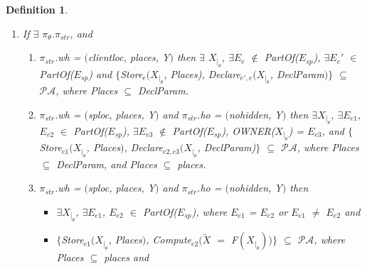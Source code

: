 \documentclass[a4paper]{article}
\newtheorem{ttd}{Definition}
\begin{document}
\begin{ttd}
\begin{enumerate}
\begin{itemize}
\item $\{$\textit{Use}$_{\textit{bywhom}}$$($$X_{|_{\theta}}$, \textit{UPurposes}), \textit{UConsent}$_{e1,e2}$$($$X_{|_{\theta}}$, \textit{UPurposes}, \textit{ByWhom}), \textit{Declare}$_{e1',e2}$$(X_{|_{\theta}}$, \textit{DeclParam}$)\}$ $\subseteq$ $\mathcal{P}\mathcal{A}$ such that  \textit{UPurposes} $\cup$ \textit{ByWhom} $\subseteq$ \textit{DeclParam}, and \textit{UPurposes} $\in$  $\pi_{col}$.\textit{upurp}.\textit{purpset}$_u$, and \textit{ByWhom}  $\subseteq$ $\pi_{use}$.\textit{whouse}. 

\end{itemize} 

\item If $\exists$ $\pi_{\theta}$.$\pi_{str}$, and 

\begin{enumerate} 
\item $\pi_{str}$.\textit{wh} = $($\textit{clientloc}, \textit{places}, Y$)$ then $\exists$ $X_{|_{\theta}}$,  $\exists$$E_e$ $\notin$ \textit{PartOf}($E_{sp}$), $\exists$$E_e'$ $\in$ \textit{PartOf}($E_{sp}$) and  $\{$\textit{Store}$_{e}$$(X_{|_{\theta}}$, \textit{Places}), \textit{Declare}$_{e',e}$$(X_{|_{\theta}}$, \textit{DeclParam}$)\}$ $\subseteq$ $\mathcal{P}\mathcal{A}$, where \textit{Places} $\subseteq$ \textit{DeclParam}. 

\item $\pi_{str}$.\textit{wh} = $($\textit{sploc}, \textit{places}, Y$)$ and $\pi_{str}$.\textit{ho} = $($\textit{nohidden}, Y$)$ then $\exists$$X_{|_{\theta}}$, $\exists$$E_{e1}$, $E_{e2}$ $\in$ \textit{PartOf}($E_{sp}$), $\exists$$E_{e3}$ $\notin$ \textit{PartOf}($E_{sp}$), OWNER($X_{|_{\theta}}$) = $E_{e3}$, and $\{$\textit{Store}$_{e1}$$(X_{|_{\theta}}$, \textit{Places}$)$, \textit{Declare}$_{e2,e3}$$(X_{|_{\theta}}$, \textit{DeclParam})$\}$ $\subseteq$ $\mathcal{P}\mathcal{A}$, where \textit{Places} $\subseteq$ \textit{DeclParam}, and \textit{Places} $\subseteq$ \textit{places}. 

\item $\pi_{str}$.\textit{wh} = $($\textit{sploc}, \textit{places}, Y$)$ and $\pi_{str}$.\textit{ho} = $($\textit{nohidden}, Y$)$ then 

\begin{itemize} 
\item $\exists$$X_{|_{\theta}}$, $\exists$$E_{e1}$, $E_{e2}$ $\in$ \textit{PartOf}($E_{sp}$), where $E_{e1}$ = $E_{e2}$ or $E_{e1}$ $\neq$ $E_{e2}$ and 

\item $\{$\textit{Store}$_{e1}$$(X_{|_{\theta}}$, \textit{Places}$)$, \textit{Compute}$_{e2}$$($$\tilde{X}$ $=$ F$(X_{|_{\theta}})$$)$$\}$ $\subseteq$ $\mathcal{P}\mathcal{A}$, where \textit{Places} $\subseteq$ \textit{places} and 


\end{itemize}
\end{enumerate}
\end{enumerate}
\end{ttd}
\end{document}
